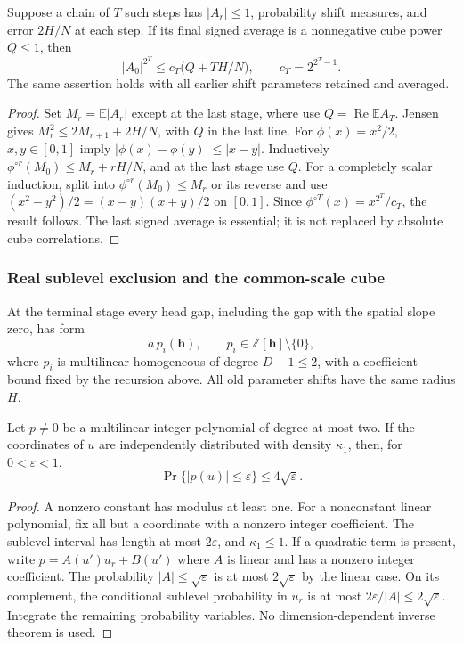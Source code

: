 \documentclass[11pt]{article}
\theoremstyle{definition}
\begin{document}
\begin{lemma}\label{patch:cs-loss}
Suppose a chain of $T$ such steps has $|A_r|\leq1$, probability shift measures, and error
$2H/N$ at each step.  If its final signed average is a nonnegative cube power $Q\leq1$, then
\[
 |A_0|^{2^T}\leq c_T\bigl(Q+T H/N\bigr),\qquad c_T=2^{2^T-1}.
\]
The same assertion holds with all earlier shift parameters retained and averaged.
\end{lemma}
\begin{proof}
Set $M_r=\mathbb E|A_r|$ except at the last stage, where use $Q=\operatorname{Re}\mathbb E A_T$.
Jensen gives $M_r^2\leq2M_{r+1}+2H/N$, with $Q$ in the last line.
For $\phi(x)=x^2/2$, $x,y\in[0,1]$ imply
$|\phi(x)-\phi(y)|\leq|x-y|$.  Inductively
$\phi^{\circ r}(M_0)\leq M_r+rH/N$, and at the last stage use $Q$.
For a completely scalar induction, split into $\phi^{\circ r}(M_0)\leq M_r$ or its reverse
and use $(x^2-y^2)/2=(x-y)(x+y)/2$ on $[0,1]$.
Since $\phi^{\circ T}(x)=x^{2^T}/c_T$, the result follows.
The last signed average is essential; it is not replaced by absolute cube correlations.
\end{proof}

\subsubsection{Real sublevel exclusion and the common-scale cube}
At the terminal stage every head gap, including the gap with the spatial slope zero, has form
\[
 a\,p_i(\mathbf h),\qquad p_i\in\mathbb Z[\mathbf h]\setminus\{0\},
\]
where $p_i$ is multilinear homogeneous of degree $D-1\leq2$, with a coefficient bound fixed
by the recursion above.  All old parameter shifts have the same radius $H$.

\begin{lemma}\label{patch:multiaffine-sublevel}
Let $p\ne0$ be a multilinear integer polynomial of degree at most two.  If the coordinates
of $u$ are independently distributed with density $\kappa_1$, then, for $0<\varepsilon<1$,
\[
 \Pr\{|p(u)|\leq\varepsilon\}\leq4\sqrt\varepsilon.
\]
\end{lemma}
\begin{proof}
A nonzero constant has modulus at least one.  For a nonconstant linear polynomial, fix all
but a coordinate with a nonzero integer coefficient.  The sublevel interval has length at
most $2\varepsilon$, and $\kappa_1\leq1$.
If a quadratic term is present, write $p=A(u')u_r+B(u')$ where $A$ is linear and has a
nonzero integer coefficient.  The probability $|A|\leq\sqrt\varepsilon$ is at most
$2\sqrt\varepsilon$ by the linear case.  On its complement, the conditional sublevel
probability in $u_r$ is at most $2\varepsilon/|A|\leq2\sqrt\varepsilon$.
Integrate the remaining probability variables.  No dimension-dependent inverse theorem is used.
\end{proof}
\end{document}

